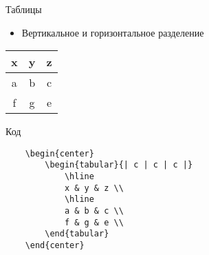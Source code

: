 
\begin{frame}[fragile]{Таблицы}

\begin{itemize}
    \item Вертикальное и горизонтальное разделение
\end{itemize}

\begin{center}
    \begin{tabular}{| c | c | c |}
        \hline
        x & y & z \\
        \hline
        a & b & c \\
        f & g & e \\
    \end{tabular}
\end{center}

\begin{block}{Код}
    \begin{lstlisting}
    \begin{center}
        \begin{tabular}{| c | c | c |}
            \hline
            x & y & z \\
            \hline
            a & b & c \\
            f & g & e \\
        \end{tabular}
    \end{center}
    \end{lstlisting}
\end{block}

\end{frame}


